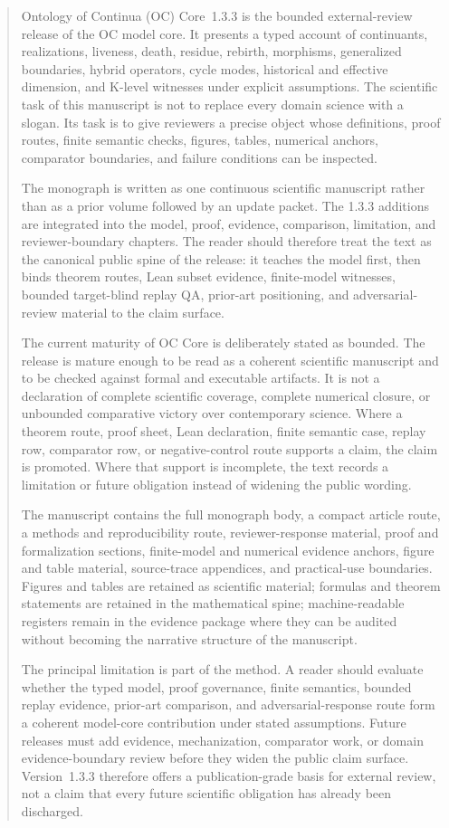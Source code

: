 \clearpage
\begin{abstract}
Ontology of Continua (OC) Core~1.3.3 is the bounded external-review release of
the OC model core. It presents a typed account of continuants, realizations,
liveness, death, residue, rebirth, morphisms, generalized boundaries, hybrid
operators, cycle modes, historical and effective dimension, and K-level
witnesses under explicit assumptions. The scientific task of this manuscript is
not to replace every domain science with a slogan. Its task is to give reviewers
a precise object whose definitions, proof routes, finite semantic checks,
figures, tables, numerical anchors, comparator boundaries, and failure
conditions can be inspected.

The monograph is written as one continuous scientific manuscript rather than as
a prior volume followed by an update packet. The 1.3.3 additions are integrated
into the model, proof, evidence, comparison, limitation, and reviewer-boundary
chapters. The reader should therefore treat the text as the canonical public
spine of the release: it teaches the model first, then binds theorem routes,
Lean subset evidence, finite-model witnesses, bounded target-blind replay QA,
prior-art positioning, and adversarial-review material to the claim surface.

The current maturity of OC Core is deliberately stated as bounded. The release
is mature enough to be read as a coherent scientific manuscript and to be
checked against formal and executable artifacts. It is not a declaration of
complete scientific coverage, complete numerical closure, or unbounded
comparative victory over contemporary science. Where a theorem route, proof sheet,
Lean declaration, finite semantic case, replay row, comparator row, or
negative-control route supports a claim, the claim is promoted. Where that
support is incomplete, the text records a limitation or future obligation
instead of widening the public wording.

The manuscript contains the full monograph body, a compact article route, a
methods and reproducibility route, reviewer-response material, proof and
formalization sections, finite-model and numerical evidence anchors, figure and
table material, source-trace appendices, and practical-use boundaries. Figures
and tables are retained as scientific material; formulas and theorem statements
are retained in the mathematical spine; machine-readable registers remain in
the evidence package where they can be audited without becoming the narrative
structure of the manuscript.

The principal limitation is part of the method. A reader should evaluate whether
the typed model, proof governance, finite semantics, bounded replay evidence,
prior-art comparison, and adversarial-response route form a coherent model-core
contribution under stated assumptions. Future releases must add evidence,
mechanization, comparator work, or domain evidence-boundary review before they widen the
public claim surface. Version~1.3.3 therefore offers a publication-grade basis
for external review, not a claim that every future scientific obligation has
already been discharged.
\end{abstract}

